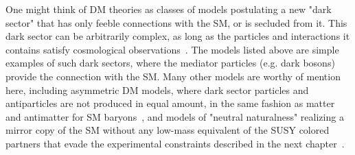 One might think of DM theories as classes of models postulating a new "dark sector" that has only feeble connections with the SM, or is secluded from it. This dark sector can be arbitrarily complex, as long as the particles and interactions it contains satisfy cosmological observations~\cite{Strassler:2006im}. The models listed above are simple examples of such dark sectors, where the mediator particles (e.g. dark bosons) provide the connection with the SM. Many other models are worthy of mention here, including asymmetric DM models, where dark sector particles and antiparticles are not produced in equal amount, in the same fashion as matter and antimatter for SM baryons~\cite{Zurek:2013wia}, and models of "neutral naturalness" realizing a mirror copy of the SM without any low-mass equivalent of the SUSY colored partners that evade the experimental constraints described in the next chapter~\cite{Craig:2014aea}. 












